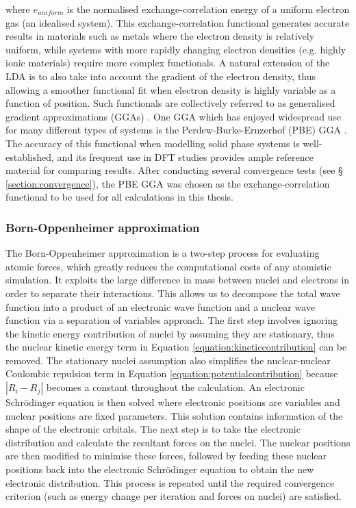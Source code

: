 where $e_{uniform}$ is the normalised exchange-correlation energy of a uniform electron gas (an idealised system). This exchange-correlation functional generates accurate results in materials such as metals where the electron density is relatively uniform, while systems with more rapidly changing electron densities (e.g. highly ionic materials) require more complex functionals. A natural extension of the LDA is to also take into account the gradient of the electron density, thus allowing a smoother functional fit when electron density is highly variable as a function of position. Such functionals are collectively referred to as generalised gradient approximations (GGAs) \cite{Langreth1980, Langreth1983, Becke1988, perdew2008restoring}. One GGA which has enjoyed widespread use for many different types of systems is the Perdew-Burke-Ernzerhof (PBE) GGA \cite{Perdew1996}. The accuracy of this functional when modelling solid phase systems is well-established, and its frequent use in DFT studies provides ample reference material for comparing results. After conducting several convergence tests (see § \ref{section:convergence}), the PBE GGA was chosen as the exchange-correlation functional to be used for all calculations in this thesis.

\subsubsection{Born-Oppenheimer approximation}

The Born-Oppenheimer approximation is a two-step process for evaluating atomic forces, which greatly reduces the computational costs of any atomistic simulation. It exploits the large difference in mass between nuclei and electrons in order to separate their interactions. This allows us to decompose the total wave function into a product of an electronic wave function and a nuclear wave function via a separation of variables approach. The first step involves ignoring the kinetic energy contribution of nuclei by assuming they are stationary, thus the nuclear kinetic energy term in Equation \ref{equation:kineticcontribution} can be removed. The stationary nuclei assumption also simplifies the nuclear-nuclear Coulombic repulsion term in Equation \ref{equation:potentialcontribution} because $|R_i - R_j|$ becomes a constant throughout the calculation. An electronic Schr\"{o}dinger equation is then solved where electronic positions are variables and nuclear positions are fixed parameters. This solution contains information of the shape of the electronic orbitals. The next step is to take the electronic distribution and calculate the resultant forces on the nuclei. The nuclear positions are then modified to minimise these forces, followed by feeding these nuclear positions back into the electronic Schr\"{o}dinger equation to obtain the new electronic distribution. This process is repeated until the required convergence criterion (such as energy change per iteration and forces on nuclei) are satisfied.

